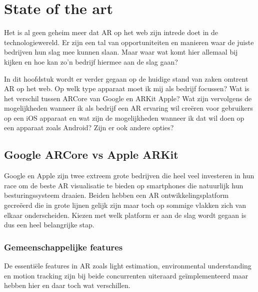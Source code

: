 \chapter{State of the art}
\label{ch:stand-van-zaken}



Het is al geen geheim meer dat AR op het web zijn intrede doet in de technologiewereld. Er zijn een tal van opportuniteiten en manieren waar de juiste bedrijven hun slag mee kunnen slaan. Maar waar wat komt hier allemaal bij kijken en hoe kan zo'n bedrijf hiermee aan de slag gaan? 

In dit hoofdstuk wordt er verder gegaan op de huidige stand van zaken omtrent AR op het web. Op welk type apparaat moet ik mij als bedrijf focussen? Wat is het verschil tussen ARCore van Google en ARKit Apple? Wat zijn vervolgens de mogelijkheden wanneer ik als bedrijf een AR ervaring wil creëren voor gebruikers op een iOS apparaat en wat zijn de mogelijkheden wanneer ik dat wil doen op een apparaat zoals Android? Zijn er ook andere opties?

\section{Google ARCore vs Apple ARKit}
\label{sec:google-arcore-vs-apple-arkit}

Google en Apple zijn twee extreem grote bedrijven die heel veel investeren in hun race om de beste AR visualisatie te bieden op smartphones die natuurlijk hun besturingssysteem draaien. Beiden hebben een AR ontwikkelingsplatform gecreëerd die in grote lijnen gelijk zijn maar toch op sommige vlakken zich van elkaar onderscheiden. Kiezen met welk platform er aan de slag wordt gegaan is dus een heel belangrijke stap. 

\subsection{Gemeenschappelijke features}

De essentiële features in AR zoals light estimation, environmental understanding en motion tracking zijn bij beide concurrenten uiteraard geïmplementeerd maar hebben  hier en daar toch wat verschillen. 


